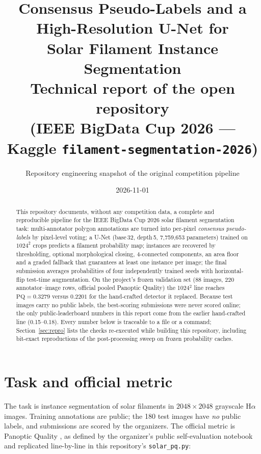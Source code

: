 \documentclass[11pt]{article}
\title{Consensus Pseudo-Labels and a High-Resolution U-Net for\\
Solar Filament Instance Segmentation\\
\large Technical report of the open repository\\
(IEEE BigData Cup 2026 --- Kaggle \texttt{filament-segmentation-2026})}
\author{Repository engineering snapshot of the original competition pipeline}
\date{2026-11-01}
\newcommand{\pq}{\mathrm{PQ}}
\begin{document}
\maketitle

\begin{abstract}
This repository documents, without any competition data, a complete and
reproducible pipeline for the IEEE BigData Cup 2026 solar filament
segmentation task: multi-annotator polygon annotations are turned into
per-pixel \emph{consensus pseudo-labels} by pixel-level voting; a U-Net
(base\,32, depth\,5, 7{,}759{,}653 parameters) trained on $1024^2$ crops
predicts a filament probability map; instances are recovered by thresholding,
optional morphological closing, 4-connected components, an area floor and a
graded fallback that guarantees at least one instance per image; the final
submission averages probabilities of four independently trained seeds with
horizontal-flip test-time augmentation. On the project's frozen validation
set (88 images, 220 annotator--image rows, official pooled Panoptic Quality)
the 1024$^2$ line reaches $\pq=0.3279$ versus $0.2201$ for the
hand-crafted detector it replaced. Because test images carry no public
labels, the best-scoring submissions were never scored online; the only
public-leaderboard numbers in this report come from the earlier
hand-crafted line (0.15--0.18). Every number below is traceable to a file
or a command; Section~\ref{sec:repro} lists the checks re-executed while
building this repository, including bit-exact reproductions of the
post-processing sweep on frozen probability caches.
\end{abstract}

\section{Task and official metric}
\label{sec:task}

The task is instance segmentation of solar filaments in $2048\times2048$
grayscale H$\alpha$ images. Training annotations are public; the 180 test
images have \emph{no} public labels, and submissions are scored by the
organizers. The official metric is Panoptic Quality
\cite{kirillov2019}, as defined by the organizer's public self-evaluation
notebook \cite{notebook} and replicated line-by-line in this repository's
\texttt{solar\_pq.py}:
\end{document}
